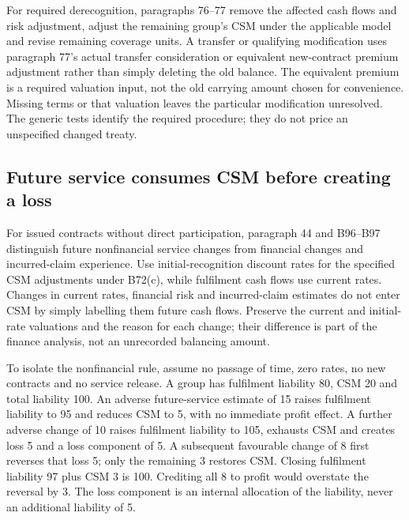 For required derecognition, paragraphs 76--77 remove the affected cash flows and risk adjustment, adjust the remaining group's CSM under the applicable model and revise remaining coverage units. A transfer or qualifying modification uses paragraph 77's actual transfer consideration or equivalent new-contract premium adjustment rather than simply deleting the old balance. The equivalent premium is a required valuation input, not the old carrying amount chosen for convenience. Missing terms or that valuation leaves the particular modification unresolved. The generic tests identify the required procedure; they do not price an unspecified changed treaty.



\hypertarget{future-service-consumes-csm-before-creating-a-loss}{%
\subsection{Future service consumes CSM before creating a loss}\label{future-service-consumes-csm-before-creating-a-loss}}

For issued contracts without direct participation, paragraph 44 and B96--B97 \citep[IFRS~17.44,48--52,B72,B96--97]{eu20231803} distinguish future nonfinancial service changes from financial changes and incurred-claim experience. Use initial-recognition discount rates for the specified CSM adjustments under B72(c), while fulfilment cash flows use current rates. Changes in current rates, financial risk and incurred-claim estimates do not enter CSM by simply labelling them future cash flows. Preserve the current and initial-rate valuations and the reason for each change; their difference is part of the finance analysis, not an unrecorded balancing amount.

To isolate the nonfinancial rule, assume no passage of time, zero rates, no new contracts and no service release. A group has fulfilment liability 80, CSM 20 and total liability 100. An adverse future-service estimate of 15 raises fulfilment liability to 95 and reduces CSM to 5, with no immediate profit effect. A further adverse change of 10 raises fulfilment liability to 105, exhausts CSM and creates loss 5 and a loss component of 5. A subsequent favourable change of 8 first reverses that loss 5; only the remaining 3 restores CSM. Closing fulfilment liability 97 plus CSM 3 is 100. Crediting all 8 to profit would overstate the reversal by 3. The loss component is an internal allocation of the liability, never an additional liability of 5.

